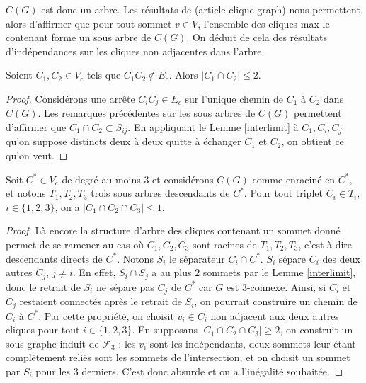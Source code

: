 \documentclass{scrartcl}
\begin{document}
\begin{flushleft}
$C(G)$ est donc un arbre. Les résultats de (article clique graph) nous permettent alors
d'affirmer que pour tout sommet $v \in V$, l'ensemble des cliques max le contenant forme un
sous arbre de $C(G)$. On déduit de cela des résultats d'indépendances sur les cliques non
adjacentes dans l'arbre.

\begin{prop}\label{bornecliqueind}
    Soient $C_1, C_2 \in V_c$ tels que $C_1C_2 \notin E_c$. Alors $|C_1 \cap C_2| \leq 2$.
\end{prop}

\begin{proof}
    Considérons une arrête $C_i C_j \in E_c$ sur l'unique chemin de $C_1$ à $C_2$ dans $C(G)$.
    Les remarques précédentes sur les sous arbres de $C(G)$ permettent d'affirmer que
    $C_1 \cap C_2 \subset S_{ij}$.
    En appliquant le Lemme \ref{interlimit} à $C_1, C_i, C_j$ qu'on suppose distincts deux à
    deux quitte à échanger $C_1$ et $C_2$, on obtient ce qu'on veut.
\end{proof}

\begin{prop}\label{borneclique3}
    Soit $C^* \in V_c$ de degré au moins $3$ et considérons $C(G)$ comme enraciné en $C^*$,
    et notons $T_1, T_2, T_3$ trois sous arbres descendants de $C^*$. Pour tout triplet
    $C_i \in T_i$, $i \in \{1, 2, 3\}$, on a $|C_1 \cap C_2 \cap C_3| \leq 1$.
\end{prop}


\begin{proof}
    Là encore la structure d'arbre des cliques contenant un sommet donné permet de se ramener
    au cas où $C_1, C_2, C_3$ sont racines de $T_1, T_2, T_3$, c'est à dire descendants directs
    de $C^*$.\newline
    Notons $S_i$ le séparateur $C_i \cap C^*$. $S_i$ sépare $C_i$ des deux autres $C_j$, $j \neq i$.
    En effet, $S_i \cap S_j$ a au plus $2$ sommets par le Lemme \ref{interlimit}, donc le retrait
    de $S_i$ ne sépare pas $C_j$ de $C^*$ car $G$ est $3$-connexe. Ainsi, si $C_i$ et $C_j$
    restaient connectés après le retrait de $S_i$, on pourrait construire un chemin de $C_i$ à $C^*$.
    \medskip \newline
    Par cette propriété, on choisit $v_i \in C_i$ non adjacent aux deux autres cliques pour
    tout $i \in \{1, 2, 3\}$. En supposans $|C_1 \cap C_2 \cap C_3| \geq 2$, on construit un
    sous graphe induit de $\mathcal{F}_3$ : les $v_i$ sont les indépendants, deux sommets
    leur étant complètement reliés sont les sommets de l'intersection, et on choisit un sommet
    par $S_i$ pour les $3$ derniers. C'est donc absurde et on a l'inégalité souhaitée.
\end{proof}


\end{flushleft}
\end{document}
